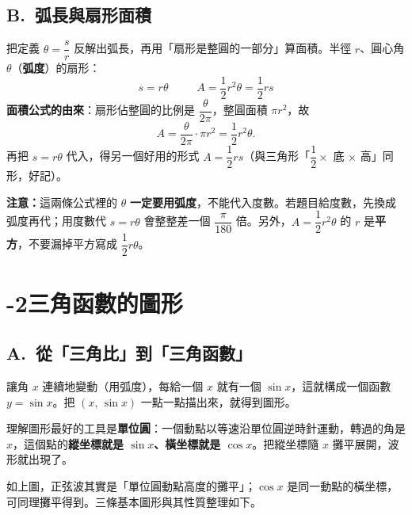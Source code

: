 \documentclass[11pt]{article}
\begin{document}
\subsection*{\sffamily B.\ 弧長與扇形面積}

把定義 $\theta=\dfrac{s}{r}$ 反解出弧長，再用「扇形是整圓的一部分」算面積。半徑 $r$、圓心角 $\theta$（\textbf{弧度}）的扇形：
$$\boxed{\;s=r\theta\;}\qquad\boxed{\;A=\frac{1}{2}r^2\theta=\frac{1}{2}rs\;}$$
\textbf{面積公式的由來}：扇形佔整圓的比例是 $\dfrac{\theta}{2\pi}$，整圓面積 $\pi r^2$，故
$$A=\frac{\theta}{2\pi}\cdot\pi r^2=\frac{1}{2}r^2\theta.$$
再把 $s=r\theta$ 代入，得另一個好用的形式 $A=\dfrac{1}{2}rs$（與三角形「$\dfrac12\times$ 底 $\times$ 高」同形，好記）。

\textbf{注意：}這兩條公式裡的 $\theta$ \textbf{一定要用弧度}，不能代入度數。若題目給度數，先換成弧度再代；用度數代 $s=r\theta$ 會整整差一個 $\dfrac{\pi}{180}$ 倍。另外，$A=\dfrac12 r^2\theta$ 的 $r$ 是\textbf{平方}，不要漏掉平方寫成 $\dfrac12 r\theta$。

\section*{-2\quad 三角函數的圖形}

\subsection*{\sffamily A.\ 從「三角比」到「三角函數」}

讓角 $x$ 連續地變動（用弧度），每給一個 $x$ 就有一個 $\sin x$，這就構成一個函數 $y=\sin x$。把 $(x,\,\sin x)$ 一點一點描出來，就得到圖形。

理解圖形最好的工具是\textbf{單位圓}：一個動點以等速沿單位圓逆時針運動，轉過的角是 $x$，這個點的\textbf{縱坐標就是 $\sin x$、橫坐標就是 $\cos x$}。把縱坐標隨 $x$ 攤平展開，波形就出現了。


如上圖，正弦波其實是「單位圓動點高度的攤平」；$\cos x$ 是同一動點的橫坐標，可同理攤平得到。三條基本圖形與其性質整理如下。

\end{document}
